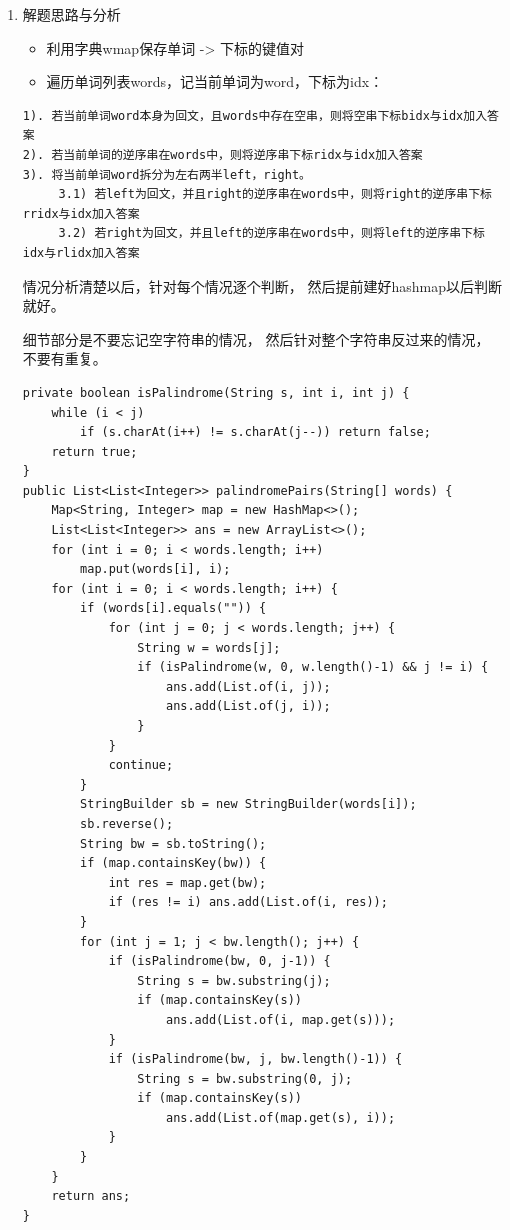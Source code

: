 \documentclass[9pt, b5paaper]{book}
\begin{document}
\begin{enumerate}
\item 解题思路与分析
\label{sec-7-0-2-1}
\begin{itemize}
\item 利用字典wmap保存单词 -> 下标的键值对
\item 遍历单词列表words，记当前单词为word，下标为idx：
\end{itemize}
\begin{verbatim}
1). 若当前单词word本身为回文，且words中存在空串，则将空串下标bidx与idx加入答案
2). 若当前单词的逆序串在words中，则将逆序串下标ridx与idx加入答案
3). 将当前单词word拆分为左右两半left，right。
     3.1) 若left为回文，并且right的逆序串在words中，则将right的逆序串下标rridx与idx加入答案
     3.2) 若right为回文，并且left的逆序串在words中，则将left的逆序串下标idx与rlidx加入答案
\end{verbatim}

情况分析清楚以后，针对每个情况逐个判断， 然后提前建好hashmap以后判断就好。

细节部分是不要忘记空字符串的情况， 然后针对整个字符串反过来的情况，不要有重复。
\begin{verbatim}
private boolean isPalindrome(String s, int i, int j) {
    while (i < j) 
        if (s.charAt(i++) != s.charAt(j--)) return false;
    return true;
}
public List<List<Integer>> palindromePairs(String[] words) {
    Map<String, Integer> map = new HashMap<>();
    List<List<Integer>> ans = new ArrayList<>();
    for (int i = 0; i < words.length; i++) 
        map.put(words[i], i);
    for (int i = 0; i < words.length; i++) {
        if (words[i].equals("")) {
            for (int j = 0; j < words.length; j++) {
                String w = words[j];
                if (isPalindrome(w, 0, w.length()-1) && j != i) {
                    ans.add(List.of(i, j));
                    ans.add(List.of(j, i));
                }
            }
            continue;
        }
        StringBuilder sb = new StringBuilder(words[i]);
        sb.reverse();
        String bw = sb.toString();
        if (map.containsKey(bw)) {
            int res = map.get(bw);
            if (res != i) ans.add(List.of(i, res));
        }
        for (int j = 1; j < bw.length(); j++) {
            if (isPalindrome(bw, 0, j-1)) {
                String s = bw.substring(j);
                if (map.containsKey(s))
                    ans.add(List.of(i, map.get(s)));
            }
            if (isPalindrome(bw, j, bw.length()-1)) {
                String s = bw.substring(0, j);
                if (map.containsKey(s))
                    ans.add(List.of(map.get(s), i));
            }
        }
    }
    return ans;
}
\end{verbatim}


\end{enumerate}
\end{document}
